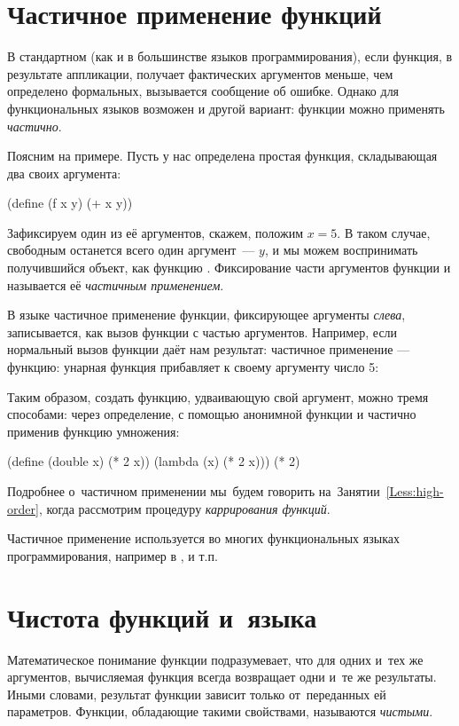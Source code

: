 \section[4]{Частичное применение функций}%
%
В стандартном \Racket (как и в большинстве языков программирования), если функция, в результате аппликации, получает фактических аргументов меньше, чем определено формальных, вызывается сообщение об ошибке. Однако для функциональных языков возможен и другой вариант: функции можно применять \emph{частично}.

Поясним на примере. Пусть у нас определена простая функция, складывающая два своих аргумента:

\begin{Definition}[emph={x,y}]
  (define (f x y)
    (+ x y))
\end{Definition}
\newpage

Зафиксируем один из её аргументов, скажем, положим $x = 5$. В таком случае, свободным останется всего один аргумент~--- $y$, и мы можем воспринимать получившийся объект, как функцию . Фиксирование части аргументов функции и называется её \emph{частичным применением}.

В языке \Scheme частичное применение функции, фиксирующее аргументы \emph{слева}, записывается, как вызов функции с частью аргументов. Например, если нормальный вызов функции даёт нам результат:
 частичное применение --- функцию:
 унарная функция  прибавляет к своему аргументу число 5:

Таким образом, создать функцию, удваивающую свой аргумент, можно тремя способами: через определение, с помощью анонимной функции и частично применив функцию умножения:
\begin{SchemeCode}
  (define (double x) (* 2 x))
  (lambda (x) (* 2 x)))
  (* 2)
\end{SchemeCode}

Подробнее о~частичном применении мы~будем говорить на~Занятии~\ref{Less:high-order}, когда рассмотрим процедуру \emph{каррирования функций}.

Частичное применение используется во многих функциональных языках программирования, например в ,  и т.п.

\section{Чистота функций и~языка}%
Математическое понимание функции подразумевает, что для одних и~тех же аргументов, вычисляемая функция всегда возвращает одни и~те же результаты. Иными словами, результат функции зависит только от~переданных ей параметров. Функции, обладающие такими свойствами, называются \emph{чистыми}.

